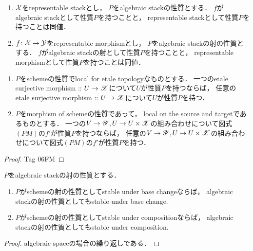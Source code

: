 \documentclass[a4paper, dvipdfmx]{jsarticle}
\newcommand{\rep}{{\color{blue}\#}}
\begin{document}
\begin{Lemma}[\rep]
\enumfix
\begin{enumerate}
    \item
    $\mathcal{X}$をrepresentable stackとし，
    $P$をalgebraic stackの性質とする．
    $f$がalgebraic stackとして性質$P$を持つことと，
    representable stackとして性質$P$を持つことは同値．

    \item 
    $f \colon \mathcal{X} \to \mathcal{Y}$をrepresentable morphismとし，
    $P$をalgebraic stackの射の性質とする．
    $f$がalgebraic stackの射として性質$P$を持つことと，
    representable morphismとして性質$P$を持つことは同値．
\end{enumerate}
\end{Lemma}

\begin{Lemma}[\rep]
    \enumfix
\begin{enumerate}
    \item
        $P$をschemeの性質でlocal for etale topologyなものとする．\mnewline
        一つのetale surjective morphism :: $U \to \mathscr{X}$について$U$が性質$P$を持つならば，\mnewline
        任意のetale surjective morphism :: $U \to \mathscr{X}$について$U$が性質$P$を持つ．
    \item
        $P$をmorphism of schemeの性質であって，
        local on the source and targetであるものとする．\mnewline
        一つの$V \to \mathscr{Y}, U \to U \times \mathscr{X}$の組み合わせについて図式$(PM)$の$f'$が性質$P$を持つならば，\mnewline
        任意の$V \to \mathscr{Y}, U \to U \times \mathscr{X}$の組み合わせについて図式$(PM)$の$f'$が性質$P$を持つ．
\end{enumerate}
\end{Lemma}
\begin{proof}
    \cite{StacksProj} Tag 06FM
\end{proof}

\begin{Lemma}[\rep]
        $P$をalgebraic stackの射の性質とする．
\begin{enumerate}
    \item
        $P$がschemeの射の性質としてstable under base changeならば，
        algebraic stackの射の性質としてもstable under base change.
    \item
        $P$がschemeの射の性質としてstable under compositionならば，
        algebraic stackの射の性質としてもstable under composition.
\end{enumerate}
\end{Lemma}
\begin{proof}
    algebraic spaceの場合の繰り返しである．
\end{proof}



\end{document}
